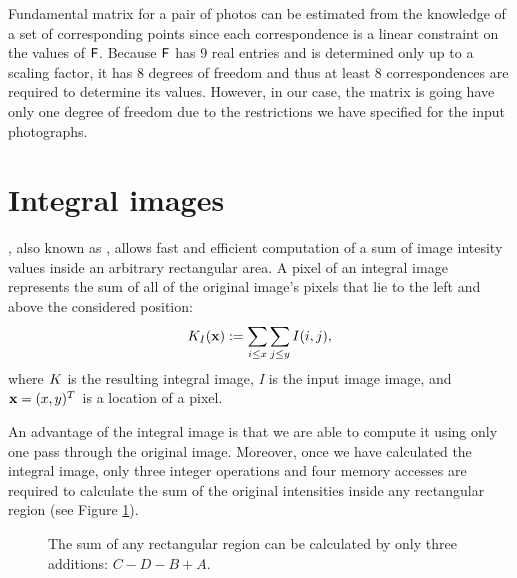 Fundamental matrix for a pair of photos can be estimated from the knowledge of a set of corresponding points since each correspondence is a linear constraint on the values of $\mathsf{F}$. 
Because $\mathsf{F}$ has $9$ real entries and is determined only up to a scaling factor, it has $8$ degrees of freedom and thus at least $8$ correspondences are required to determine its values. 
However, in our case, the matrix is going have only one degree of freedom due to the restrictions we have specified for the input photographs. 

\section{Integral images}

, also known as , allows fast and efficient computation of a sum of image intesity values inside an arbitrary rectangular area.
A pixel of an integral image represents the sum of all of the original image's pixels that lie to the left and above the considered position: 
\begin{equation*}
K_I(\mathbf{x}) := \sum_{i \le x} \sum_{j \le y} I(i,j),
\end{equation*}
where $K$ is the resulting integral image, \emph{I} is the input image image, and $\mathbf{x} = (x, y)^{T}$ is a location of a pixel.

An advantage of the integral image is that we are able to compute it using only one pass through the original image. 
Moreover, once we have calculated the integral image, only three integer operations and four memory accesses are required to calculate the sum 
of the original intensities inside any rectangular region (see Figure \ref{fig:integral}).

\begin{figure}[h]
  \label{fig:integral}
  \caption{The sum of any rectangular region can be calculated by only three additions: $C - D - B + A$.}
\end{figure}

